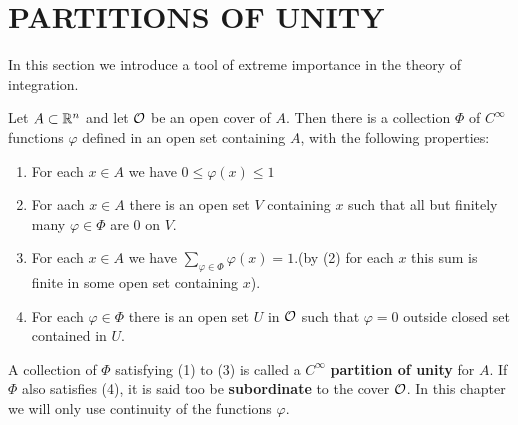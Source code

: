 \clearpage
\section[\textsc{partition of unity}]{PARTITIONS OF UNITY}
In this section we introduce a tool of extreme importance in
the theory of integration.

\begin{theorem}
    Let $A \subset \mathbb{R}^n$ and let $\mathcal{O}$ be an open cover of $A$.
    Then there is a collection $\Phi$ of $C^\infty$ functions $\varphi$ defined in an open
    set containing $A$, with the following properties:
    \begin{enumerate}[label=\upshape{(\arabic*)}]
        \item For each $x\in A$ we have $0\le \varphi(x)\le 1$ 
        \item For aach $x\in A$ there is an open set $V$ containing $x$ such that 
            all but finitely many $\varphi\in \Phi$ are 0 on $V$.
        \item For each $x\in A$ we have $\sum_{\varphi\in \Phi}\varphi(x)=1$.(by (2) for each 
            $x$ this sum is finite in some open set containing $x$).
        \item For each $\varphi\in \Phi$ there is an open set $U$ in $\mathcal{O}$ 
            such that $\varphi=0$ outside closed set contained in $U$. 
    \end{enumerate}
\end{theorem}

A collection of $\Phi$ satisfying (1) to (3) is called a $C^\infty$ \textbf{partition of unity}
for $A$. If $\Phi$ also satisfies (4), it is said too be \textbf{subordinate} to the cover $\mathcal{O}$.
In this chapter we will only use continuity of the functions $\varphi$.

